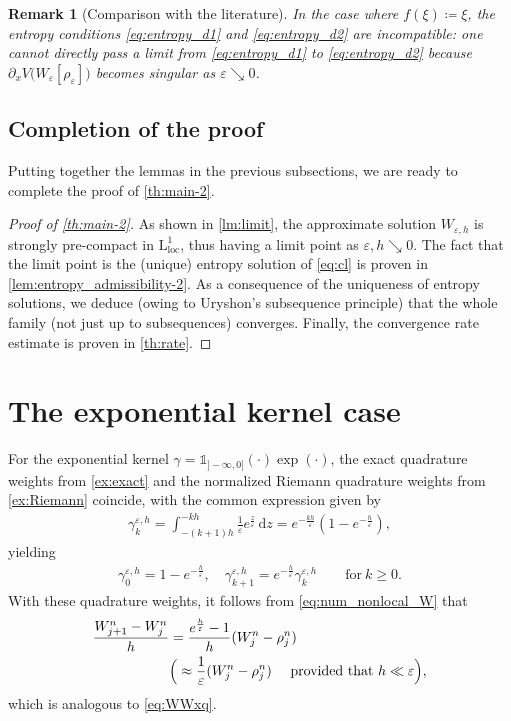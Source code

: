 \documentclass[10pt]{amsart}
\theoremstyle{plain}
\newtheorem{remark}[lemma]{Remark}
\theoremstyle{definition}
\numberwithin{equation}{section}
\newcommand{\eps}{{\varepsilon}}
\newcommand{\dd}{\,\mathrm{d}}
\begin{document}
\begin{remark}[Comparison with the literature]
In the case where $f(\xi)\coloneqq \xi$, the entropy conditions \cref{eq:entropy_d1} and \cref{eq:entropy_d2} are incompatible: one cannot directly pass a limit from \cref{eq:entropy_d1} to \cref{eq:entropy_d2} because $\partial_x V\big(W_\eps[\rho_\eps]\big)$ becomes singular as $\eps\searrow0$. 
\end{remark}



\subsection{Completion of the proof}
\label{ssec:conclusion-of-proof}


Putting together the lemmas in the previous subsections, we are ready to complete the proof of \cref{th:main-2}.

\begin{proof}[Proof of \cref{th:main-2}]
As shown in \cref{lm:limit}, the approximate solution $W_{\varepsilon,h}$ is strongly pre-compact in $\mathrm{L}^1_{\mathrm{loc}}$, thus having a limit point as $\eps,h\searrow0$. The fact that the limit point is the (unique) entropy solution of \cref{eq:cl} is proven in \cref{lem:entropy_admissibility-2}. As a consequence of the uniqueness of entropy solutions, we deduce (owing to Uryshon's subsequence principle) that the whole family (not just up to subsequences) converges. Finally, the convergence rate estimate is proven in \cref{th:rate}.
\end{proof}


\section{The exponential kernel case}
\label{sec:exp}

For the exponential kernel $\gamma=\mathds{1}_{]-\infty,0]}(\cdot)\exp(\cdot)$, the exact quadrature weights from \cref{ex:exact} and the normalized Riemann quadrature weights from \cref{ex:Riemann} coincide, with the common expression given by
\begin{align}\label{eq:quad}
    \gamma_k^{\eps,h} = \int_{-(k+1)h}^{-kh} \frac1\eps e^{\frac{z}{\eps}} \dd z = e^{-\frac{kh}\eps} \left( 1 - e^{-\frac{h}\eps} \right),
\end{align}
yielding 
\begin{align*}
    \gamma_0^{\eps,h} = 1 - e^{-\frac{h}\eps}, \quad \gamma_{k+1}^{\eps,h} = e^{-\frac{h}\eps} \gamma_k^{\eps,h} \qquad \text{for}\ k\geq0.
\end{align*}
With these quadrature weights, it follows from \cref{eq:num_nonlocal_W} that
\begin{align} \label{eq:exp-form1a}
    \frac{W_{j+1}^n - W_j^n}{h} &= \frac{e^{\frac{h}\eps} - 1}{h} (W_j^n - \rho_j^n) \\
    &\Big(\approx \frac1\eps (W_j^n - \rho_j^n) \quad \text{ provided that $h\ll\eps$}\Big), \notag 
\end{align}
which is analogous to \cref{eq:WWxq}.
\end{document}
